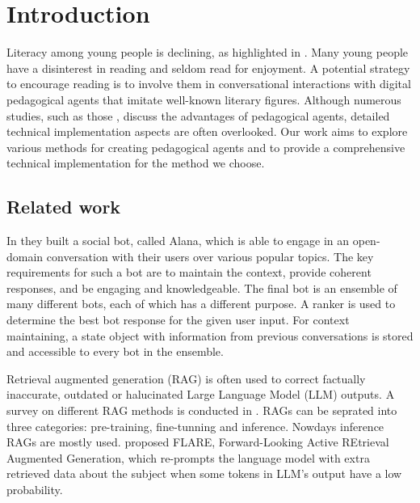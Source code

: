\documentclass[fleqn,moreauthors,10pt]{ds_report}
\affiliation{\textit{Advisors: Slavko Žitnik}}
\begin{document}
\flushbottom

\maketitle

\thispagestyle{empty}


\section*{Introduction}

Literacy among young people is declining, as highlighted in \cite{murray2021literacy}. Many young people have a disinterest in reading and seldom read for enjoyment. A potential strategy to encourage reading is to involve them in conversational interactions with digital pedagogical agents that imitate well-known literary figures. Although numerous studies, such as those \cite{nielen2018digital,alaimi2020pedagogical}, discuss the advantages of pedagogical agents, detailed technical implementation aspects are often overlooked. Our work aims to explore various methods for creating pedagogical agents and to provide a comprehensive technical implementation for the method we choose.

\subsection*{Related work}
In \cite{papaioannou2022designing} they built a social bot, called Alana, which is able to engage in an open-domain conversation with their users over various popular topics. The key requirements for such a bot are to maintain the context, provide coherent responses, and be engaging and knowledgeable. The final bot is an ensemble of many different bots, each of which has a different purpose. A ranker is used to determine the best bot response for the given user input. For context maintaining, a state object with information from previous conversations is stored and accessible to every bot in the ensemble.

Retrieval augmented generation (RAG) is often used to correct factually inaccurate, outdated or halucinated Large Language Model (LLM) outputs. A survey on different RAG methods is conducted in \cite{gao2023retrieval}. RAGs can be seprated into three categories: pre-training, fine-tunning and inference. Nowdays inference RAGs are mostly used. \cite{jiang2023active} proposed FLARE, Forward-Looking Active REtrieval Augmented Generation, which re-prompts the language model with extra retrieved data about the subject when some tokens in LLM's output have a low probability.
\end{document}
